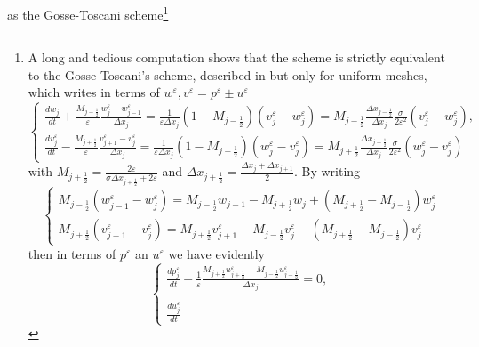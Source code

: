 \documentclass[a4paper,french,english,10pt]{article}
\newcommand\eps{\varepsilon}
\begin{document}
as the Gosse-Toscani scheme\footnote{A 
long and tedious computation  shows that the  scheme is strictly
equivalent to 
  the   Gosse-Toscani's scheme, described in    \cite{Gosse} but only for
uniform meshes, which writes in terms of $w^{\eps} ,v^{\eps} =p^{\eps} \pm u^{\eps} $
\begin{equation*} \label{hhe:diagnum}
\left\{
\begin{array}{ll}
\displaystyle\frac{d w_j}{dt}
+\frac{ M_{j- \frac12} }{\varepsilon}
\frac{  w_j^{\eps}  -  w_{j-1}^{\eps} }{\Delta  x_j}=
\frac{1  }{\varepsilon\Delta  x_j}(1-M_{j-
\frac12})(v_j^{\eps}  -w_j^{\eps}  )=
 M_{j- \frac12}  
\frac{\Delta  x_{j- \frac12}}{\Delta  x_j}\frac{ \sigma }{2\varepsilon^2}
(v_j^{\eps} -w_j^{\eps} ),   \\
\displaystyle\frac{ dv_j^{\eps}  }{dt}
-\frac{  M_{j+ \frac12} }{\varepsilon}
\frac{  v_{j+1} ^{\eps} - v_j^{\eps} }{\Delta  x_j}=\frac{1  }{\varepsilon\Delta  x_j}(1-M_{j+
\frac12})(w_j ^{\eps}  -v_j^{\eps}  )
=
 M_{j+ \frac12} \frac{\Delta  x_{j+ \frac12}}{\Delta  x_j}
\frac{ \sigma}{2\varepsilon^2} (w_j^{\eps} -v_j^{\eps} )
\end{array}
\right.
\end{equation*}
with 
$M_{j+ \frac12} =\frac {2  \varepsilon }{\sigma\Delta  x_{j+ \frac12} + 2 
\varepsilon }
$%
and $ \Delta  x_{j+ \frac12}=\frac{\Delta  x_{j}+\Delta  x_{j+1}}{2}$. 
By writing
\begin{equation*} \label{hhe:toto}
\left\{
\begin{array}{ll}
M_{j- \frac12}
( w_{j-1}^{\eps}  - w_j^{\eps}    ) = M_{j- \frac12}w_{j-1} -M_{j+ \frac12}w_j + (M_{j+
\frac12}-M_{j- \frac12}) w_j^{\eps} \\
 M_{j+ \frac12} (  v_{j+1}^{\eps}  - v_j^{\eps} )=M_{j+ \frac12}
v_{j+1}^{\eps}  -M_{j- \frac12}v_j^{\eps}  -
(M_{j+ \frac12}-M_{j- \frac12})v_j^{\eps} 
\end{array}
\right.
\end{equation*}
then  in terms of $p^{\eps} $ an $u^{\eps} $ we have evidently
\begin{equation*} \label{eq:63num}
\left\{
\begin{array}{l}
\displaystyle\frac{dp_j^{\eps} }{dt }
+\frac{1}{\varepsilon}\frac{ M_{j+ \frac12}  u_{j+\frac12}^{\eps} 
-
M_{j- \frac12}  u_{j-\frac12}^{\eps}  }{\Delta  x_j}
=0,   \\
\\
\displaystyle\frac{du_j^{\eps} }{dt }

\end{array}
\end{equation*}}
\end{document}
